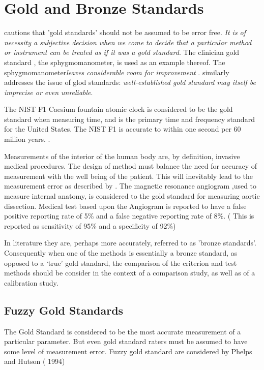 \section{Gold and Bronze Standards}

\noindent \citet[p.47]{DunnSEME} cautions that 'gold standards' should not be assumed to be error free. \emph{It is of necessity a subjective decision when we come to decide that a particular method or instrument can be treated as if it was a gold standard}.
The clinician gold standard , the sphygmomanometer, is used as an example thereof.  The sphygmomanometer\emph{leaves considerable room for improvement} \citep{DunnSEME}. \citet{pizzi} similarly addresses the issue of glod standards: \emph{well-established gold standard may itself be imprecise or even unreliable}.


The NIST F1 Caesium fountain atomic clock is considered to be the gold standard when measuring time, and is the primary time and frequency standard for the United States. The NIST F1 is accurate
to within one second per 60 million years. \citep{NIST}.

Measurements of the interior of the human body are, by definition, invasive medical procedures. The design of method must balance the need for accuracy of measurement with the well being of the patient. This will inevitably lead to the measurement error as described by \citet{DunnSEME}. The magnetic resonance angiogram ,used to measure internal anatomy,  is considered to the gold standard for measuring aortic dissection. Medical test based upon the Angiogram is reported to have a false positive reporting rate of 5\% and a false negative reporting rate of 8\%. ( This is
reported as sensitivity of 95\% and a specificity of 92\%)
\citep{ACR}

In literature they are, perhaps more accurately, referred to as
'bronze standards'. Consequently when one of the methods is
essentially a bronze standard, as opposed to a `true' gold
standard, the comparison of the criterion and test methods should
be consider in the context of a comparison study, as well as of a
calibration study.



\subsection{Fuzzy Gold Standards} The Gold Standard is considered to be the most
accurate measurement of a particular parameter. But even gold
standard raters must be assumed to have some level of measurement
error. Fuzzy gold standard are considered by Phelps and Hutson (
1994)

